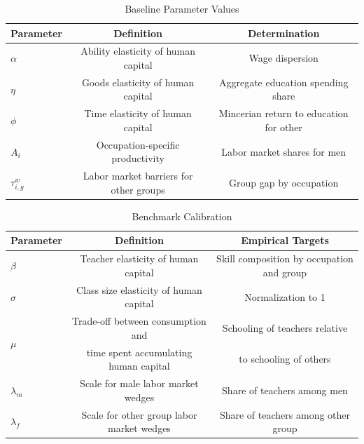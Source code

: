 \documentclass[onehalfspacing,11pt]{article}
\begin{document}
	\begin{table}[h!]
		\centering
		\begin{tabular}{lcc}
			\toprule
			\toprule
			Parameter & Definition & Determination\\
			\midrule
			$\alpha$ & Ability elasticity of human capital & Wage dispersion \\
			$\eta$ & Goods elasticity of human capital & Aggregate education spending share  \\
			$\phi$ & Time elasticity of human capital & Mincerian return to education for other \\
			$A_{i}$ & Occupation-specific productivity & Labor market shares for men\\
			$\tau^{w}_{i,g}$ & Labor market barriers for other groups & Group gap by occupation\\
			\bottomrule
		\end{tabular}
		\caption{Baseline Parameter Values}
		\label{tab:param}
	\end{table}
	
		\begin{table}[h!]
		\centering
		\begin{tabular}{lcc}
			\toprule
			\toprule
			Parameter & Definition & Empirical Targets\\
			\midrule
			$\beta$ & Teacher elasticity of human capital & Skill composition by occupation and group \\
			$\sigma$ & Class size elasticity of human capital & Normalization to 1\\
			\multirow{2}{*}{$\mu$} &  Trade-off between consumption and & Schooling of teachers relative\\
			& time spent accumulating human capital & to schooling of others\\
			$\lambda_m$ & Scale for male labor market wedges & Share of teachers among men\\
		    $\lambda_f$ & Scale for other group labor market wedges & Share of teachers among other group\\
			\bottomrule
		\end{tabular}
		\caption{Benchmark Calibration}
		\label{tab:calibr}
	\end{table}
	
	
\end{document}
